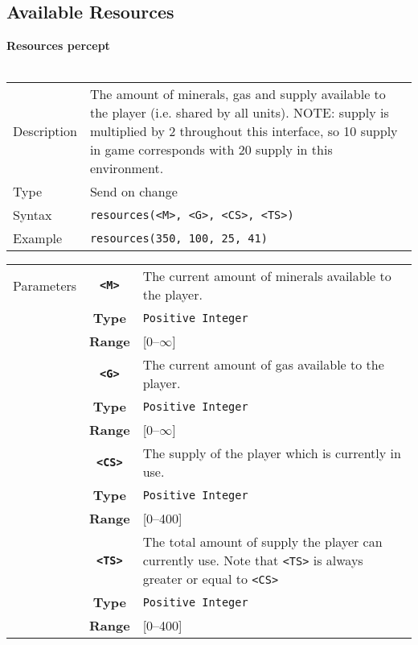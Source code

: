 \subsection{Available Resources}
\textbf{Resources percept}\\
\\
\begin{tabularx}{\textwidth}{lX}
 Description & The amount of minerals, gas and supply available to the player (i.e. shared by all units). NOTE: supply is multiplied by 2 throughout this interface, so 10 supply in game corresponds with 20 supply in this environment. \\
 Type & Send on change \\
 Syntax & \verb|resources(<M>, <G>, <CS>, <TS>)| \\
 Example & \verb|resources(350, 100, 25, 41)| \\
 \end{tabularx}
 \begin{tabularx}{\textwidth}{l | c | p{8cm}|}
 \cline{2-3}
 Parameters & \textbf{\verb|<M>|} & The current amount of minerals available to the player. \\
            & \textbf{Type} & \verb|Positive Integer| \\
            & \textbf{Range} & [0--$\infty$] \\
            \cline{2-3}
            & \textbf{\verb|<G>|} & The current amount of gas available to the player. \\
            & \textbf{Type} & \verb|Positive Integer| \\
            & \textbf{Range} & [0--$\infty$] \\
            \cline{2-3}
            & \textbf{\verb|<CS>|} & The supply of the player which is currently in use. \\
            & \textbf{Type} & \verb|Positive Integer| \\
            & \textbf{Range} & [0--400] \\
            \cline{2-3}
            & \textbf{\verb|<TS>|} & The total amount of supply the player can currently use. Note that \verb|<TS>| is always greater or equal to \verb|<CS>| \\
            & \textbf{Type} & \verb|Positive Integer| \\
            & \textbf{Range} & [0--400] \\
            \cline{2-3}
\end{tabularx}\\
\\
\newpage

